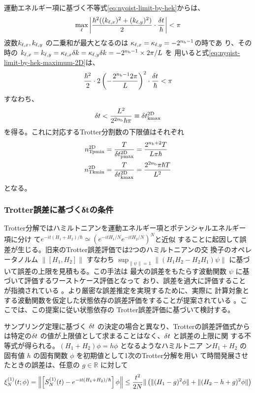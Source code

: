 \documentclass[fontsize=11pt]{jlreq}
\begin{document}
運動エネルギー項に基づく不等式\eqref{eq:nyqist-limit-by-hek}からは、
\begin{equation}
\max_{\ell}{\left| \frac{\hbar^2((k_{\ell,x})^2+(k_{\ell,y})^2)}{2}\cdot\frac{\delta t}{\hbar} \right|} < \pi
\label{eq:nyqist-limit-by-hek-maximum-2D}
\end{equation}
波数$k_{\ell,x},k_{\ell,y}$ の二乗和が最大となるのは $\kappa_{\ell,x}=\kappa_{\ell,y}=-2^{n_{\mathrm{b}}-1}$の時であ
り、その時の $k_{\ell,x}=k_{\ell,y}=\kappa_{\ell,x}\delta k=\kappa_{\ell,y}\delta k=-2^{n_{\mathrm{b}}-1}\times2\pi/L$ を
用いると式\eqref{eq:nyqist-limit-by-hek-maximum-2D}は、
\begin{equation}
\frac{\hbar^2}{2}\cdot2\left(-\frac{2^{n_{\mathrm{b}}-1}2\pi}{L}\right)^2\cdot\frac{\delta t}{\hbar}<\pi
\end{equation}
すなわち、
\begin{equation}
\delta t < \frac{L^2}{2^{2n_{\mathrm{b}}}\hbar\pi} \equiv\delta t_{\mathrm{kmax}}^{\mathrm{2D}}
 \label{eq:nyqist-limit-by-hek-final-2D}
\end{equation}
を得る。これに対応するTrotter分割数の下限値はそれぞれ
\begin{align}
    n_{\mathrm{Tpmin}}^{\mathrm{2D}} &= \frac{T}{\delta t_{\mathrm{pmax}}^{\mathrm{2D}}}=\frac{2^{n_{\mathrm{b}}+2}T}{L\pi\hbar} \\
    n_{\mathrm{Tkmin}}^{\mathrm{2D}} &= \frac{T}{\delta t_{\mathrm{kmax}}^{\mathrm{2D}}}=\frac{2^{2n_{\mathrm{b}}}\pi\hbar T}{L^2}
\end{align}
となる。

\subsubsection{Trotter誤差に基づくδtの条件}
\label{subsec:deltat-selection-by-trotter-error}
Trotter分解ではハミルトニアンを運動エネルギー項とポテンシャルエネルギー項に分け
て$e^{-it(H_1+H_2)/\hbar}\simeq\left(e^{-i{tH}_1/N}e^{-itH_2/N}\right)^N$と近似
することに起因して誤差が生じる。旧来のTrotter誤差評価では2つのハミルトニアンの交
換子のオペレータノルム $\| [H_1,H_2] \|$ すなわち
$\sup_{\|\psi\|=1}\|(H_1H_2-H_2H_1)\psi\|$ に基づいて誤差の上限を見積もる。この手法は
最大の誤差をもたらす波動関数 $\psi$ に基づいて評価するワーストケース評価となって
おり、誤差を過大に評価することが指摘されている
\cite{Childs2021.PhysRevX.11.011020}。より厳密な誤差推定を実現するために、実際に
計算対象とする波動関数を仮定した状態依存の誤差評価をすることが提案されている
\cite{Burgarth2024.PhysRevResearch.6.043155}。ここでは、この提案に従い状態依存の
Trotter誤差評価に基づいて検討する。

サンプリング定理に基づく $\delta t$ の決定の場合と異なり、Trotterの誤差評価式から
は特定の$\delta t$ の値が上限値として求まることはなく、$\delta t$ と誤差の上限に関
する不等式が得られる。$\left(H_1+H_2\right)\phi=h\phi$ となるようなハミルトニア
ン$H_1+H_2$ の固有値 $h$ の固有関数 $\phi$ を初期値として1次のTrotter分解を用い
て時間発展させたときの誤差は、任意の $g\in\mathbb{R}$ に対して
\begin{equation}
    \xi_{N}^{(1)}(t;\phi)=\left\|\left[S_{N}^{(1)}(t)-e^{-it(H_1+H_2)/\hbar}\right]\phi\right\|
    \leq\frac{t^2}{2N}\| \left(\|(H_1-g)^2\phi\|+\|(H_2-h+g)^2\phi\|\right)
    \label{eq:observed-trotter-error-1st}
\end{equation}
\end{document}
